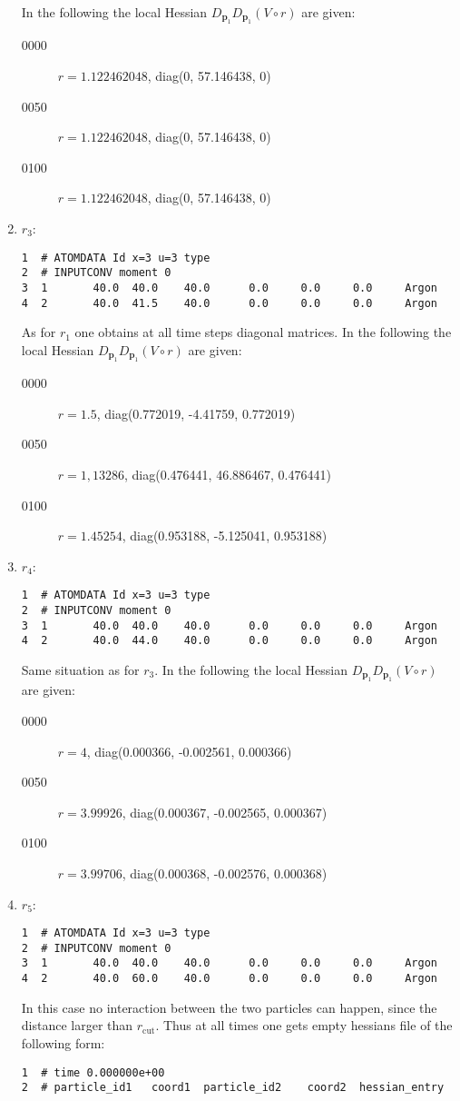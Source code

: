 \documentclass[a4paper]{article}
\newcommand{\boldp}{\boldsymbol{p}}
\begin{document}
\begin{enumerate}
In the following the local Hessian \(D_{\boldp_1} D_{\boldp_1} (V\circ r)\) are given:
\begin{description}
\item[{0000}] \(r = 1.122462048\), diag(0, 57.146438, 0)
\item[{0050}] \(r = 1.122462048\), diag(0, 57.146438, 0)
\item[{0100}] \(r = 1.122462048\), diag(0, 57.146438, 0)
\end{description}
\item \(r_3\):
\label{sec-1-4-2-4}
\begin{verbatim}
1  # ATOMDATA Id x=3 u=3 type
2  # INPUTCONV moment 0
3  1       40.0  40.0    40.0      0.0     0.0     0.0     Argon
4  2       40.0  41.5    40.0      0.0     0.0     0.0     Argon
\end{verbatim}
As for \(r_1\) one obtains at all time steps diagonal matrices.
In the following the local Hessian \(D_{\boldp_1} D_{\boldp_1} (V\circ r)\) are given:
\begin{description}
\item[{0000}] \(r = 1.5\), diag(0.772019, -4.41759, 0.772019)
\item[{0050}] \(r = 1,13286\), diag(0.476441, 46.886467, 0.476441)
\item[{0100}] \(r = 1.45254\), diag(0.953188, -5.125041, 0.953188)
\end{description}
\item \(r_4\):
\label{sec-1-4-2-5}
\begin{verbatim}
1  # ATOMDATA Id x=3 u=3 type
2  # INPUTCONV moment 0
3  1       40.0  40.0    40.0      0.0     0.0     0.0     Argon
4  2       40.0  44.0    40.0      0.0     0.0     0.0     Argon
\end{verbatim}
Same situation as for \(r_3\).
In the following the local Hessian \(D_{\boldp_1} D_{\boldp_1} (V\circ r)\) are given:
\begin{description}
\item[{0000}] \(r = 4\), diag(0.000366, -0.002561, 0.000366)
\item[{0050}] \(r = 3.99926\), diag(0.000367, -0.002565, 0.000367)
\item[{0100}] \(r = 3.99706\), diag(0.000368, -0.002576, 0.000368)
\end{description}
\item \(r_5\):
\label{sec-1-4-2-6}
\begin{verbatim}
1  # ATOMDATA Id x=3 u=3 type
2  # INPUTCONV moment 0
3  1       40.0  40.0    40.0      0.0     0.0     0.0     Argon
4  2       40.0  60.0    40.0      0.0     0.0     0.0     Argon
\end{verbatim}
In this case no interaction between the two particles can happen, since the distance larger than \(r_{\textrm{cut}}\). Thus at all times one gets empty hessians file of the following form:
\begin{verbatim}
1  # time 0.000000e+00
2  # particle_id1   coord1  particle_id2    coord2  hessian_entry
\end{verbatim}
\end{enumerate}
\end{document}

